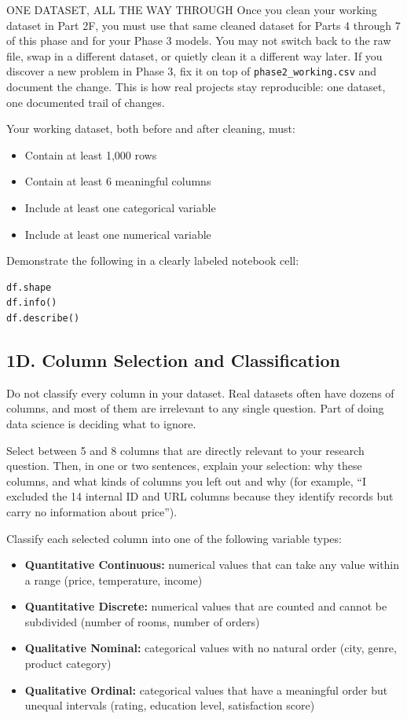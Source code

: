 \documentclass[11pt,letterpaper]{article}
\newcommand{\code}[1]{\texttt{#1}}
\begin{document}
\begin{callout}{ONE DATASET, ALL THE WAY THROUGH}
Once you clean your working dataset in Part 2F, you must use that same cleaned dataset for Parts 4 through 7 of this phase and for your Phase 3 models. You may not switch back to the raw file, swap in a different dataset, or quietly clean it a different way later. If you discover a new problem in Phase 3, fix it on top of \code{phase2\_working.csv} and document the change. This is how real projects stay reproducible: one dataset, one documented trail of changes.
\end{callout}

Your working dataset, both before and after cleaning, must:
\begin{itemize}
  \item Contain at least 1,000 rows
  \item Contain at least 6 meaningful columns
  \item Include at least one categorical variable
  \item Include at least one numerical variable
\end{itemize}

Demonstrate the following in a clearly labeled notebook cell:
\begin{lstlisting}
df.shape
df.info()
df.describe()
\end{lstlisting}

\subsection{1D. Column Selection and Classification}

Do not classify every column in your dataset. Real datasets often have dozens of columns, and most of them are irrelevant to any single question. Part of doing data science is deciding what to ignore.

Select between 5 and 8 columns that are directly relevant to your research question. Then, in one or two sentences, explain your selection: why these columns, and what kinds of columns you left out and why (for example, ``I excluded the 14 internal ID and URL columns because they identify records but carry no information about price'').

Classify each selected column into one of the following variable types:
\begin{itemize}
  \item \textbf{Quantitative Continuous:} numerical values that can take any value within a range (price, temperature, income)
  \item \textbf{Quantitative Discrete:} numerical values that are counted and cannot be subdivided (number of rooms, number of orders)
  \item \textbf{Qualitative Nominal:} categorical values with no natural order (city, genre, product category)
  \item \textbf{Qualitative Ordinal:} categorical values that have a meaningful order but unequal intervals (rating, education level, satisfaction score)
\end{itemize}
\end{document}
